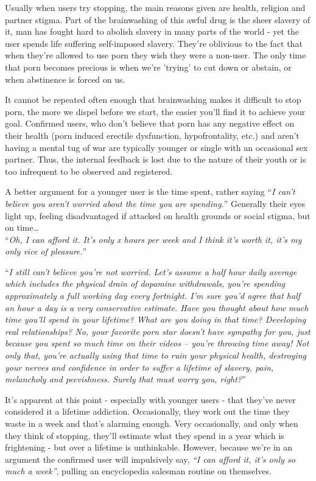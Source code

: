 \documentclass[
]{book}
\begin{document}
Usually when users try stopping, the main reasons given are health, religion and partner stigma. Part of the brainwashing of this awful drug is the sheer slavery of it, man has fought hard to abolish slavery in many parts of the world - yet the user spends life suffering self-imposed slavery. They're oblivious to the fact that when they're allowed to use porn they wish they were a non-user. The only time that porn becomes precious is when we're 'trying' to cut down or abstain, or when abstinence is forced on us.

It cannot be repeated often enough that brainwashing makes it difficult to stop porn, the more we dispel before we start, the easier you'll find it to achieve your goal. Confirmed users, who don't believe that porn has any negative effect on their health (porn induced erectile dysfunction, hypofrontality, etc.) and aren't having a mental tug of war are typically younger or single with an occasional sex partner. Thus, the internal feedback is lost due to the nature of their youth or is too infrequent to be observed and registered.

A better argument for a younger user is the time spent, rather saying ``\emph{I can't believe you aren't worried about the time you are spending.}'' Generally their eyes light up, feeling disadvantaged if attacked on health grounds or social stigma, but on time\ldots{}\\
``\emph{Oh, I can afford it. It's only x hours per week and I think it's worth it, it's my only vice of pleasure.}''

``\emph{I still can't believe you're not worried. Let's assume a half hour daily average which includes the physical drain of dopamine withdrawals, you're spending approximately a full working day every fortnight. I'm sure you'd agree that half an hour a day is a very conservative estimate. Have you thought about how much time you'll spend in your lifetime? What are you doing in that time? Developing real relationships? No, your favorite porn star doesn't have sympathy for you, just because you spent so much time on their videos -- you're throwing time away! Not only that, you're actually using that time to ruin your physical health, destroying your nerves and confidence in order to suffer a lifetime of slavery, pain, melancholy and peevishness. Surely that must worry you, right?}''

It's apparent at this point - especially with younger users - that they've never considered it a lifetime addiction. Occasionally, they work out the time they waste in a week and that's alarming enough. Very occasionally, and only when they think of stopping, they'll estimate what they spend in a year which is frightening - but over a lifetime is unthinkable. However, because we're in an argument the confirmed user will impulsively say, \emph{``I can afford it, it's only so much a week''}, pulling an encyclopedia salesman routine on themselves.
\end{document}
